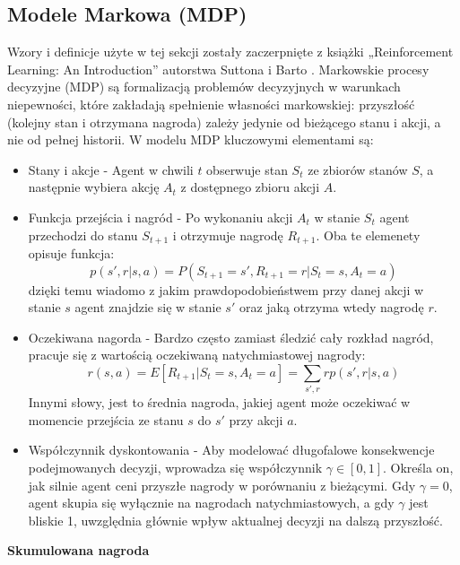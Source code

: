 \documentclass[a4paper, 12pt]{article}
\numberwithin{equation}{section}
\begin{document}
    \subsection{Modele Markowa (MDP)}
    Wzory i definicje użyte w tej sekcji zostały zaczerpnięte z książki „Reinforcement Learning: An Introduction” autorstwa Suttona i Barto \cite{sutton2018rl}.
    Markowskie procesy decyzyjne (MDP) są formalizacją problemów decyzyjnych w warunkach niepewności, które zakładają spełnienie własności markowskiej: przyszłość (kolejny stan i otrzymana nagroda) zależy jedynie od bieżącego stanu i akcji, a nie od pełnej historii.
    W modelu MDP kluczowymi elementami są:
    \begin{itemize}
        \item Stany i akcje - Agent w chwili \( t \) obserwuje stan \( S_t \) ze zbiorów stanów \( S \), a następnie wybiera akcję \( A_t \) z dostępnego zbioru akcji \( A \).
        \item Funkcja przejścia i nagród - Po wykonaniu akcji \( A_t \) w stanie \( S_t \) agent przechodzi do stanu \( S_{t+1} \) i otrzymuje nagrodę \( R_{t+1} \). Oba te elemenety opisuje funkcja:
        \begin{equation}
        p(s',r|s,a) = P(S_{t+1} = s', R_{t+1} = r | S_t = s, A_t = a)
        \end{equation}
        dzięki temu wiadomo z jakim prawdopodobieństwem przy danej akcji w stanie \( s \) agent znajdzie się w stanie \( s' \) oraz jaką otrzyma wtedy nagrodę \( r \).
        \item Oczekiwana nagorda - Bardzo często zamiast śledzić cały rozkład nagród, pracuje się z wartością oczekiwaną natychmiastowej nagrody:
        \begin{equation}
        r(s,a) = E[R_{t+1} | S_t = s, A_t = a] = \sum_{s',r} r p(s',r|s,a)
        \end{equation}
        Innymi słowy, jest to średnia nagroda, jakiej agent może oczekiwać w momencie przejścia ze stanu \( s \) do \( s' \) przy akcji \( a \).
        \item Współczynnik dyskontowania - Aby modelować długofalowe konsekwencje podejmowanych decyzji, wprowadza się współczynnik \( \gamma \in [0,1] \). Określa on, jak silnie agent ceni przyszłe nagrody w porównaniu z bieżącymi. Gdy \( \gamma = 0 \), agent skupia się wyłącznie na nagrodach natychmiastowych, a gdy \( \gamma \) jest bliskie 1, uwzględnia głównie wpływ aktualnej decyzji na dalszą przyszłość.
    \end{itemize}
    \textbf{Skumulowana nagroda} \\ \\ 
\end{document}
